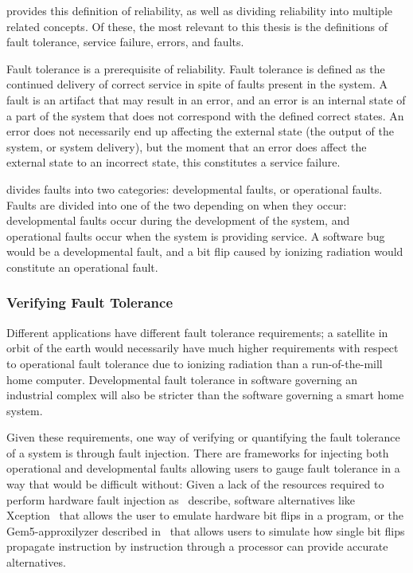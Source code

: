 \citet{avizienis2004basic} provides this definition of reliability, as well as dividing reliability into multiple related concepts. Of these, the most relevant to this thesis is the definitions of fault tolerance, service failure, errors, and faults.  

Fault tolerance is a prerequisite of reliability. Fault tolerance is defined as the continued delivery of correct service in spite of faults present in the system. A fault is an artifact that may result in an error, and an error is an internal state of a part of the system that does not correspond with the defined correct states. An error does not necessarily end up affecting the external state (the output of the system, or system delivery), but the moment that an error does affect the external state to an incorrect state, this constitutes a service failure.

\citet{avizienis2004basic} divides faults into two categories: developmental faults, or operational faults. Faults are divided into one of the two depending on when they occur: developmental faults occur during the development of the system, and operational faults occur when the system is providing service. A software bug would be a developmental fault, and a bit flip caused by ionizing radiation would constitute an operational fault.

\subsubsection{Verifying Fault Tolerance}\label{section:Verifying_fault_tolerance}

Different applications have different fault tolerance requirements; a satellite in orbit of the earth would necessarily have much higher requirements with respect to operational fault tolerance due to ionizing radiation than a run-of-the-mill home computer. Developmental fault tolerance in software governing an industrial complex will also be stricter than the software governing a smart home system. 

Given these requirements, one way of verifying or quantifying the fault tolerance of a system is through fault injection. There are frameworks for injecting both operational and developmental faults allowing users to gauge fault tolerance in a way that would be difficult without: Given a lack of the resources required to perform hardware fault injection as~\citet{arlat1993fault} describe, software alternatives like Xception~\citep{carreira1998xception} that allows the user to emulate hardware bit flips in a program, or the Gem5-approxilyzer described in~\citet{venkatagiri2019gem5} that allows users to simulate how single bit flips propagate instruction by instruction through a processor can provide accurate alternatives.

